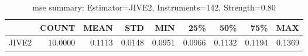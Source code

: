 \begin{table}[ht]
\centering
\caption{mse summary: Estimator=JIVE2, Instruments=142, Strength=0.80}
\begin{tabular}{lrrrrrrrr}
\toprule
 & COUNT & MEAN & STD & MIN & 25\% & 50\% & 75\% & MAX \\
\midrule
JIVE2 & 10.0000 & 0.1113 & 0.0148 & 0.0951 & 0.0966 & 0.1132 & 0.1194 & 0.1369 \\
\bottomrule
\end{tabular}
\end{table}
